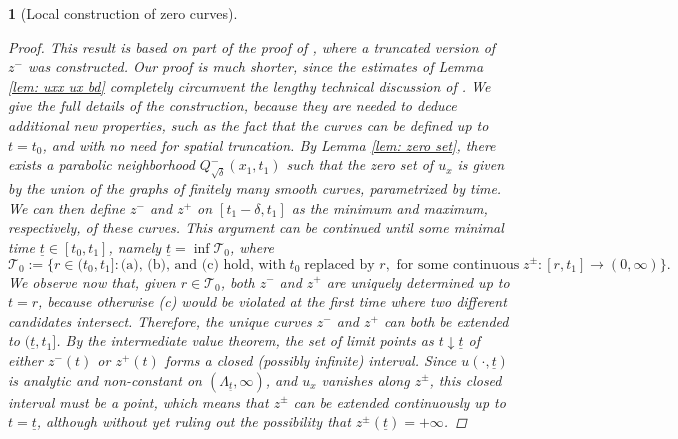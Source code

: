 \documentclass{article}
\numberwithin{equation}{section}
\numberwithin{figure}{section}
\theoremstyle{plain}
\theoremstyle{plain}
\theoremstyle{plain}
\theoremstyle{plain}
\newtheorem{lem}[thm]{\protect\lemmaname}
\theoremstyle{definition}
\theoremstyle{remark}
\def\ut{{\underline{t}}}
\providecommand{\lemmaname}{Lemma}
\begin{document}
\begin{lem}[Local construction of zero curves]
\begin{proof} This result is based on part of the proof of \cite[Lem 4.1]{delarue}, where a truncated version of $z^-$ was constructed. Our proof is much shorter, since the estimates of Lemma \ref{lem: uxx ux bd} completely circumvent the lengthy technical discussion of \cite[Lem. 4.3]{delarue}. We give the full details of the construction, because they are needed to deduce additional new properties, such as the fact that the curves can be defined up to $t=t_0$, and with no need for spatial truncation. By Lemma \ref{lem: zero set}, there exists a parabolic neighborhood $Q_{\sqrt{\delta}}^-(x_1,t_1)$ such that the zero set of $u_x$ is given by the union of the graphs of finitely many smooth curves, parametrized by time. We can then define $z^-$ and $z^+$ on $[t_1-\delta,t_1]$ as the minimum and maximum, respectively, of these curves. This argument can be continued until some minimal time $\underline{t}\in [t_0,t_1]$, namely $\underline{t}=\inf \mathcal{T}_0$, where
\[\mathcal{T}_0:=\{r\in (t_0,t_1]: \text{(a), (b), and (c) hold, with} \;t_0 \;\text{replaced by } r, \text{ for some continuous}\; z^{\pm}:[r,t_1]\to (0,\infty)\}.\]
We observe now that, given $r\in \mathcal{T}_0$, both $z^-$ and $z^+$ are uniquely determined up to $t=r$, because otherwise (c) would be violated at the first time where two different candidates intersect. Therefore, the unique curves $z^-$ and $z^+$ can both be extended to $(\ut,t_1]$. By the intermediate value theorem, the set of limit points as $t\downarrow \underline{t}$ of either $z^-(t)$ or $z^+(t)$ forms a closed (possibly infinite) interval. Since $u(\cdot,\underline{t})$ is analytic and non-constant on $(\Lambda_{\ut},\infty)$, and $u_x$ vanishes along $z^{\pm}$, this closed interval must be a point, which means that $z^{\pm}$ can be extended continuously up to $t=\underline{t}$, although without yet ruling out the possibility that $z^{\pm}(\underline{t})=+\infty$.


\end{proof}
\end{lem}
\end{document}
